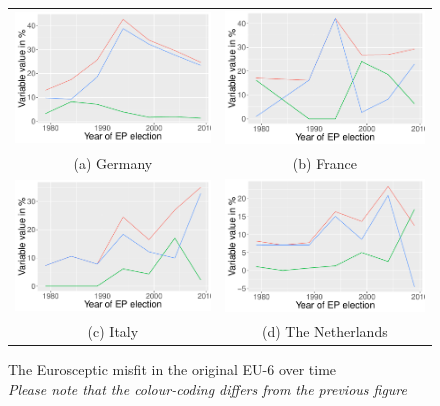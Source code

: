 \begin{figure}
	\caption{The Eurosceptic misfit in the original EU-6 over time \\ \emph{Please note that the colour-coding differs from the previous figure}}
	\label{fig: Misfit EU-6}
\begin{tabular}{cc}
	\includegraphics[width=65mm]{../../Analysis/Graphs/DE} & \includegraphics[width=65mm]{../../Analysis/Graphs/FR} \\
	(a) Germany & (b) France \\[8pt]
	\includegraphics[width=65mm]{../../Analysis/Graphs/IT} & \includegraphics[width=65mm]{../../Analysis/Graphs/NL}	\\
	(c) Italy & (d) The Netherlands \\[8pt]

\end{tabular}
\end{figure}
